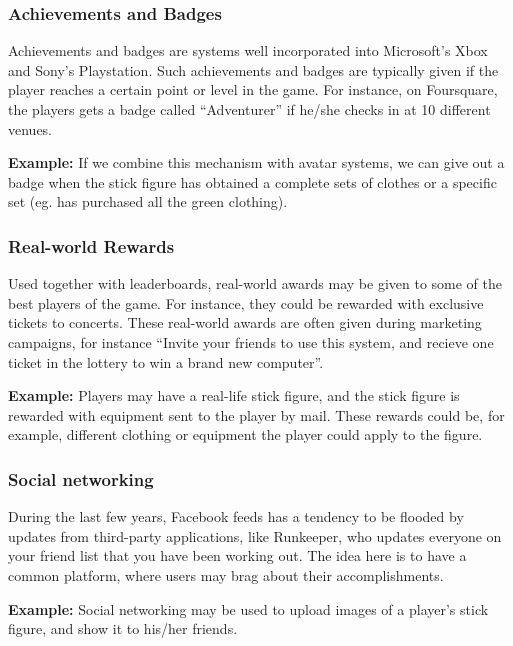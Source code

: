 \subsubsection{Achievements and Badges}
\label{sec:achievementsandbadges}
Achievements and badges are systems well incorporated into Microsoft's Xbox and Sony's Playstation. Such achievements and badges are typically given if the player reaches a certain point or level in the game. For instance, on Foursquare, the players gets a badge called ``Adventurer'' if he/she checks in at 10 different venues. 

\textbf{Example:} If we combine this mechanism with avatar systems, we can give out a badge when the stick figure has obtained a complete sets of clothes or a specific set (eg. has purchased all the green clothing).   

\subsubsection{Real-world Rewards}
\label{sec:realworldrewards}
Used together with leaderboards, real-world awards may be given to some of the best players of the game. For instance, they could be rewarded with exclusive tickets to concerts. These real-world awards are often given during marketing campaigns, for instance ``Invite your friends to use this system, and recieve one ticket in the lottery to win a brand new computer''.  

\textbf{Example:} Players may have a real-life stick figure, and the stick figure is rewarded with equipment sent to the player by mail. These rewards could be, for example, different clothing or equipment the player could apply to the figure. 

\subsubsection{Social networking}
\label{sec:socialnetworking}
During the last few years, Facebook feeds has a tendency to be flooded by updates from third-party applications, like Runkeeper, who updates everyone on your friend list that you have been working out. The idea here is to have a common platform, where users may brag about their accomplishments.      

\textbf{Example:} Social networking may be used to upload images of a player's stick figure, and show it to his/her friends. 

